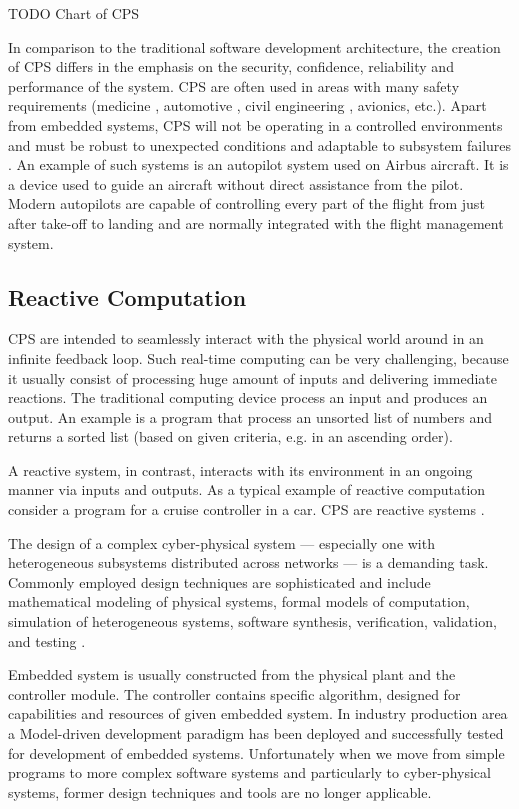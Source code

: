TODO Chart of CPS

In comparison to the traditional software development architecture, the creation of CPS differs in the emphasis on the security, confidence, reliability and performance of the system. CPS are often used in areas with many safety requirements (medicine \cite{Fainekos:InsulinPump}, automotive \cite{Oehlerking:EMBS}, civil engineering \cite{Berlink:SmartHome}, avionics, etc.). Apart from embedded systems, CPS will not be operating in a controlled environments and must be robust to unexpected conditions and adaptable to subsystem failures \cite{Lee:DesignCPS}. An example of such systems is an autopilot system used on Airbus aircraft. It is a device used to guide an aircraft without direct assistance from the pilot. Modern autopilots are capable of controlling every part of the flight from just after take-off to landing and are normally integrated with the flight management system.

\subsection{Reactive Computation}

CPS are intended to seamlessly interact with the physical world around in an infinite feedback loop. Such real-time computing can be very challenging, because it usually consist of processing huge amount of inputs and delivering immediate reactions. The traditional computing device process an input and produces an output. An example is a program that process an unsorted list of numbers and returns a sorted list (based on given criteria, e.g. in an ascending order).

A reactive system, in contrast, interacts with its environment in an ongoing manner via inputs and outputs. As a typical example of reactive computation consider a program for a cruise controller in a car. CPS are reactive systems \cite{Rajeev:PrinciplesCPS}.

The design of a complex cyber-physical system — especially one with heterogeneous subsystems distributed across networks — is a demanding task. Commonly employed design techniques are sophisticated and include mathematical modeling of physical systems, formal models of computation, simulation of heterogeneous systems, software synthesis, verification, validation, and testing \cite{Lee:MBD}.

Embedded system is usually constructed from the physical plant and the controller module. The controller contains specific algorithm, designed for capabilities and resources of given embedded system. In industry production area a Model-driven development paradigm has been deployed and successfully tested for development of embedded systems. Unfortunately when we move from simple programs to more complex software systems and particularly to cyber-physical systems, former design techniques and tools are no longer applicable.

